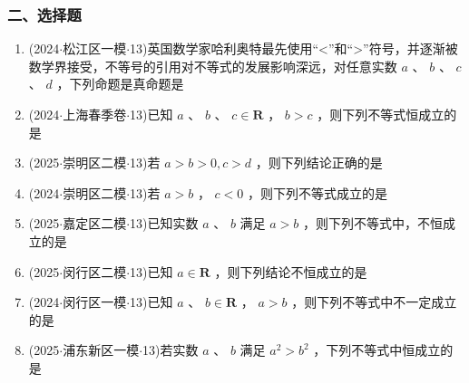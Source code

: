 \subsubsection*{二、选择题}
\begin{enumerate}
    \item (2024$\cdot$松江区一模$\cdot$13)英国数学家哈利奥特最先使用“<”和“>”符号，并逐渐被数学界接受，不等号的引用对不等式的发展影响深远，对任意实数 $a$ 、 $b$ 、 $c$ 、 $d$ ，下列命题是真命题是 

    \item (2024$\cdot$上海春季卷$\cdot$13)已知 $a$ 、 $b$ 、 $c \in  \mathbf{R}$ ， $b > c$ ，则下列不等式恒成立的是 

    \item (2025$\cdot$崇明区二模$\cdot$13)若 $a > b > 0,c > d$ ，则下列结论正确的是 

    \item (2024$\cdot$崇明区二模$\cdot$13)若 $a > b$ ， $c < 0$ ，则下列不等式成立的是 

    \item (2025$\cdot$嘉定区二模$\cdot$13)已知实数 $a$ 、 $b$ 满足 $a > b$ ，则下列不等式中，不恒成立的是 

    \item (2025$\cdot$闵行区二模$\cdot$13)已知 $a \in  \mathbf{R}$ ，则下列结论不恒成立的是 

    \item (2024$\cdot$闵行区一模$\cdot$13)已知 $a$ 、 $b \in  \mathbf{R}$ ， $a > b$ ，则下列不等式中不一定成立的是 

    \item (2025$\cdot$浦东新区一模$\cdot$13)若实数 $a$ 、 $b$ 满足 ${a}^{2} > {b}^{2}$ ，下列不等式中恒成立的是 


\end{enumerate}
